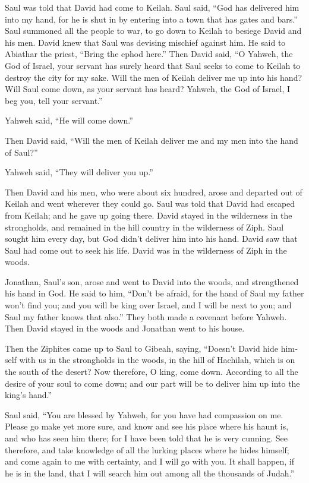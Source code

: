 \begin{paracol}{2}
\begin{otherlanguage}{english}
 Saul was told that David had come to Keilah. Saul said,
``God has delivered him into my hand, for he is shut in by entering into
a town that has gates and bars.''  Saul summoned all the
people to war, to go down to Keilah to besiege David and his men.
 David knew that Saul was devising mischief against him.
He said to Abiathar the priest, ``Bring the ephod here.''
 Then David said, ``O Yahweh, the God of Israel, your
servant has surely heard that Saul seeks to come to Keilah to destroy
the city for my sake.  Will the men of Keilah deliver me
up into his hand? Will Saul come down, as your servant has heard?
Yahweh, the God of Israel, I beg you, tell your servant.''

Yahweh said, ``He will come down.''

 Then David said, ``Will the men of Keilah deliver me and
my men into the hand of Saul?''

Yahweh said, ``They will deliver you up.''

 Then David and his men, who were about six hundred,
arose and departed out of Keilah and went wherever they could go. Saul
was told that David had escaped from Keilah; and he gave up going there.
 David stayed in the wilderness in the strongholds, and
remained in the hill country in the wilderness of Ziph. Saul sought him
every day, but God didn't deliver him into his hand. 
David saw that Saul had come out to seek his life. David was in the
wilderness of Ziph in the woods.

 Jonathan, Saul's son, arose and went to David into the
woods, and strengthened his hand in God.  He said to him,
``Don't be afraid, for the hand of Saul my father won't find you; and
you will be king over Israel, and I will be next to you; and Saul my
father knows that also.''  They both made a covenant
before Yahweh. Then David stayed in the woods and Jonathan went to his
house.

 Then the Ziphites came up to Saul to Gibeah, saying,
``Doesn't David hide himself with us in the strongholds in the woods, in
the hill of Hachilah, which is on the south of the desert?
 Now therefore, O king, come down. According to all the
desire of your soul to come down; and our part will be to deliver him up
into the king's hand.''

 Saul said, ``You are blessed by Yahweh, for you have had
compassion on me.  Please go make yet more sure, and know
and see his place where his haunt is, and who has seen him there; for I
have been told that he is very cunning.  See therefore,
and take knowledge of all the lurking places where he hides himself; and
come again to me with certainty, and I will go with you. It shall
happen, if he is in the land, that I will search him out among all the
thousands of Judah.''


\end{otherlanguage}
\end{paracol}
